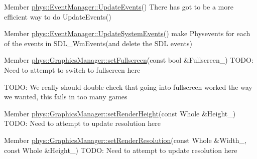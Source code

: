 \label{dd/da0/todo__todo000006}
\hypertarget{dd/da0/todo__todo000006}{}
 
\begin{DoxyDescription}
\item[Member \hyperlink{classphys_1_1EventManager_a63cf23dc9fe0ced3e2c60ca61c97b166}{phys::EventManager::UpdateEvents}() ]There has got to be a more efficient way to do UpdateEvents() 
\end{DoxyDescription}

\label{dd/da0/todo__todo000007}
\hypertarget{dd/da0/todo__todo000007}{}
 
\begin{DoxyDescription}
\item[Member \hyperlink{classphys_1_1EventManager_a0cf574c55def063d66d7db46a4d3e8a5}{phys::EventManager::UpdateSystemEvents}() ]make Physevents for each of the events in SDL\_\-WmEvents(and delete the SDL events) 
\end{DoxyDescription}

\label{dd/da0/todo__todo000009}
\hypertarget{dd/da0/todo__todo000009}{}
 
\begin{DoxyDescription}
\item[Member \hyperlink{classphys_1_1GraphicsManager_aafcf1824190e44d42a9bfbea9cfbe1b2}{phys::GraphicsManager::setFullscreen}(const bool \&Fullscreen\_\-) ]TODO: Need to attempt to switch to fullscreen here 

TODO: We really should double check that going into fullscreen worked the way we wanted, this fails in too many games 
\end{DoxyDescription}

\label{dd/da0/todo__todo000011}
\hypertarget{dd/da0/todo__todo000011}{}
 
\begin{DoxyDescription}
\item[Member \hyperlink{classphys_1_1GraphicsManager_a8d59e9a8aa2ae7f520d388a4c70f0623}{phys::GraphicsManager::setRenderHeight}(const Whole \&Height\_\-) ]TODO: Need to attempt to update resolution here 
\end{DoxyDescription}

\label{dd/da0/todo__todo000013}
\hypertarget{dd/da0/todo__todo000013}{}
 
\begin{DoxyDescription}
\item[Member \hyperlink{classphys_1_1GraphicsManager_ac6feb044d9ab394f3e65d51026a899a6}{phys::GraphicsManager::setRenderResolution}(const Whole \&Width\_\-, const Whole \&Height\_\-) ]TODO: Need to attempt to update resolution here 
\end{DoxyDescription}

